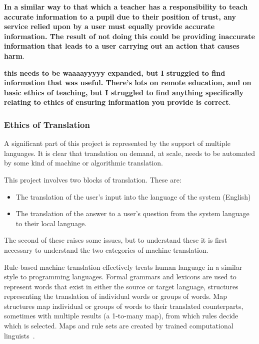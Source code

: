\documentclass{article}
\begin{document}

{\bf In a similar way to that which a teacher has a responsibility to teach accurate information to a pupil due to their position of trust, any service relied upon by a user must equally provide accurate information.  The result of not doing this could be providing inaccurate information that leads to a user carrying out an action that causes harm}.



{\bf this needs to be waaaayyyyy expanded, but I struggled to find information that was useful.  There's lots on remote education, and on basic ethics of teaching, but I struggled to find anything specifically relating to ethics of ensuring information you provide is correct}.

\subsubsection{Ethics of Translation}
A significant part of this project is represented by the support of multiple languages.  It is clear that translation on demand, at scale, needs to be automated by some kind of machine or algorithmic translation.

This project involves two blocks of translation.  These are:
\begin{itemize}
  \item The translation of the user's input into the language of the system (English)
  \item The translation of the answer to a user's question from the system language to their local language.
\end{itemize}
The second of these raises some issues, but to understand these it is first necessary to understand the two categories of machine translation.

Rule-based machine translation effectively treats human language in a similar style to programming languages.  Formal grammars and lexicons are used to represent words that exist in either the source or target language, structures representing the translation of individual words or groups of words.  Map structures map individual or groups of words to their translated counterparts, sometimes with multiple results (a 1-to-many map), from which rules decide which is selected.  Maps and rule sets are created by trained computational linguists~\cite{kenny2011ethics}.
\end{document}
